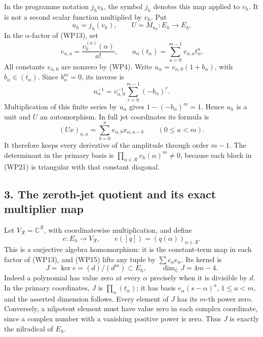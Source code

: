 \documentclass[
  10pt,
  a4paper,
]{article}
\begin{document}
In the programme notation \(j_hv_h\), the symbol \(j_h\) denotes this
map applied to \(v_h\). It is not a second scalar function multiplied by
\(v_h\). Put \[
u_h=j_h(v_h),\qquad U=M_{u_h}:E_h\longrightarrow E_h.
\tag{WP18}
\] In the \(\alpha\)-factor of (WP13), set \[
v_{\alpha,a}=\frac{v_h^{(a)}(\alpha)}{a!},
\qquad u_\alpha(t_\alpha)=\sum_{a=0}^{m-1}v_{\alpha,a}t_\alpha^a.
\tag{WP19}
\] All constants \(v_{\alpha,0}\) are nonzero by (WP4). Write
\(u_\alpha=v_{\alpha,0}(1+b_\alpha)\), with \(b_\alpha\in(t_\alpha)\).
Since \(b_\alpha^m=0\), its inverse is \[
u_\alpha^{-1}=v_{\alpha,0}^{-1}
\sum_{r=0}^{m-1}(-b_\alpha)^r.
\tag{WP20}
\] Multiplication of this finite series by \(u_\alpha\) gives
\(1-(-b_\alpha)^m=1\). Hence \(u_h\) is a unit and \(U\) an
automorphism. In full jet coordinates its formula is \[
(Ux)_{\alpha,a}=\sum_{b=0}^a v_{\alpha,b}x_{\alpha,a-b}
\qquad(0\le a<m).
\tag{WP21}
\] It therefore keeps every derivative of the amplitude through order
\(m-1\). The determinant in the primary basis is
\(\prod_{\alpha\in\mathcal R}v_h(\alpha)^m\ne0\), because each block in
(WP21) is triangular with that constant diagonal.

\subsection{3. The zeroth-jet quotient and its exact multiplier
map}\label{the-zeroth-jet-quotient-and-its-exact-multiplier-map}

Let \(V_{\mathcal R}=\mathbb C^{\mathcal R}\), with coordinatewise
multiplication, and define \[
e:E_h\longrightarrow V_{\mathcal R},\qquad
e([q])=(q(\alpha))_{\alpha\in\mathcal R}.
\tag{WP22}
\] This is a surjective algebra homomorphism: it is the constant-term
map in each factor of (WP13), and (WP15) lifts any tuple by
\(\sum c_\alpha e_\alpha\). Its kernel is \[
J=\ker e=(d)/(d^m)\subset E_h,
\qquad\dim_{\mathbb C}J=4m-4.
\tag{WP23}
\] Indeed a polynomial has value zero at every \(\alpha\) precisely when
it is divisible by \(d\). In the primary coordinates, \(J\) is
\(\prod_\alpha(t_\alpha)\); it has basis \(e_\alpha(s-\alpha)^a\),
\(1\le a<m\), and the asserted dimension follows. Every element of \(J\)
has its \(m\)-th power zero. Conversely, a nilpotent element must have
value zero in each complex coordinate, since a complex number with a
vanishing positive power is zero. Thus \(J\) is exactly the nilradical
of \(E_h\).
\end{document}
